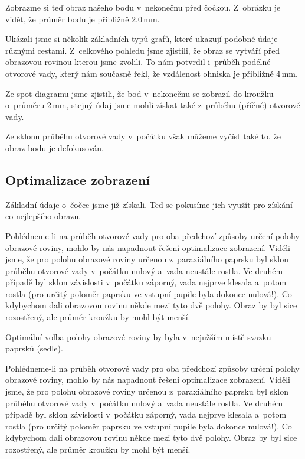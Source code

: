 Zobrazme si teď obraz našeho bodu v~nekonečnu před čočkou. Z~obrázku je vidět,
že průměr bodu je přibližně 2{,}0\,mm.
%
%

Ukázali jsme si několik základních typů grafů, které ukazují podobné údaje
různými cestami. Z~celkového pohledu jsme zjistili, že obraz se vytváří před
obrazovou rovinou kterou jsme zvolili. To nám potvrdil i~průběh podélné
otvorové vady, který nám současně řekl, že vzdálenost ohniska je přibližně
4\,mm.

Ze spot diagramu jsme zjistili, že bod v~nekonečnu se zobrazil do kroužku
o~průměru 2\,mm, stejný údaj jsme mohli získat také z~průběhu (příčné) otvorové
vady.

Ze sklonu průběhu otvorové vady v~počátku však můžeme vyčíst také to, že obraz
bodu je defokusován.

\subsection{Optimalizace zobrazení}
\label{sing-optimalizace}

Základní údaje o~čočce jsme již získali. Teď se pokusíme jich využít pro
získání co nejlepšího obrazu.

Pohlédneme-li na průběh otvorové vady pro oba předchozí způsoby určení polohy
obrazové roviny, mohlo by nás napadnout řešení optimalizace zobrazení. Viděli
jsme, že pro polohu obrazové roviny určenou z~paraxiálního paprsku byl sklon
průběhu otvorové vady v~počátku nulový a~vada neustále rostla. Ve druhém
případě byl sklon závislosti v~počátku záporný, vada nejprve klesala a~potom
rostla (pro určitý poloměr paprsku ve vstupní pupile byla dokonce nulová!). Co
kdybychom dali obrazovou rovinu někde mezi tyto dvě polohy. Obraz by byl sice
rozostřený, ale průměr kroužku by mohl být menší.

Optimální volba polohy obrazové roviny by byla v~nejužším místě svazku paprsků
(sedle).

Pohlédneme-li na průběh otvorové vady pro oba předchozí způsoby určení polohy
obrazové roviny, mohlo by nás napadnout řešení optimalizace zobrazení. Viděli
jsme, že pro polohu obrazové roviny určenou z~paraxiálního paprsku byl sklon
průběhu otvorové vady v~počátku nulový a~vada neustále rostla. Ve druhém
případě byl sklon závislosti v~počátku záporný, vada nejprve klesala a~potom
rostla (pro určitý poloměr paprsku ve vstupní pupile byla dokonce nulová!). Co
kdybychom dali obrazovou rovinu někde mezi tyto dvě polohy. Obraz by byl sice
rozostřený, ale průměr kroužku by mohl být menší.

